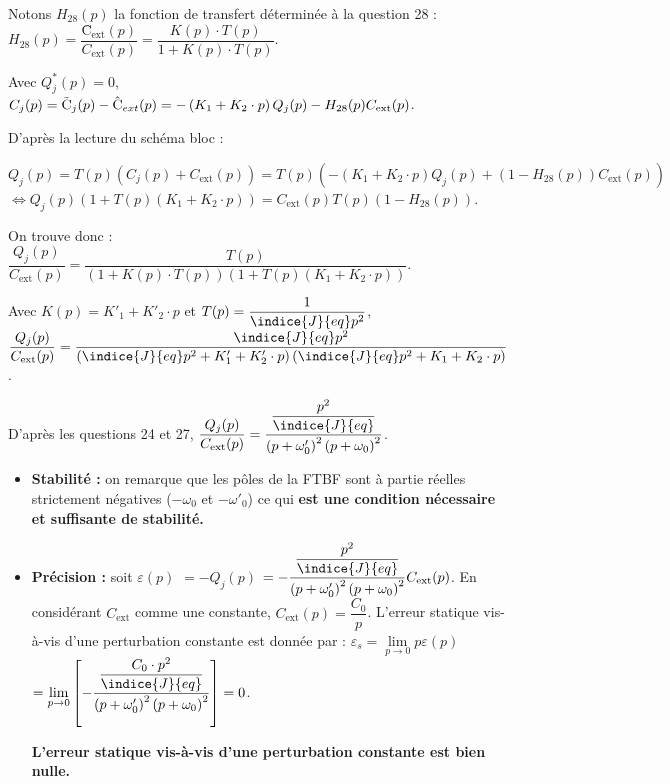 \ifprof
\begin{corrige}

Notons $H_{28}(p)$ la fonction de transfert déterminée à la question 28 :  $
H_{28}(p)=\dfrac{\text{\^{C}}_{\text{ext}}(p)}{C_{\text{ext}}(p)}=\dfrac{K(p)\cdot T(p)}{1+K(p)\cdot T(p)}$.

Avec $Q^*_j(p)=0$, $
C_j(p)=\text{\~{C}}_j(p)-\text{\^{C}}_{ext}(p)=-\left(K_1+K_2\cdot p\right)Q_j(p)-H_{28}(p)C_{\text{ext}}(p)\\
$.

D'après la lecture du schéma bloc : 

$Q_j(p)=T(p)\left(C_j(p)+C_{\text{ext}}(p)\right)=T(p)\left(-\left(K_1+K_2\cdot p\right)Q_j(p)+\left(1-H_{28}(p)\right)C_{\text{ext}}(p)\right) $
$ \Leftrightarrow 
Q_j(p)\left(1+T(p)\left(K_1+K_2\cdot p\right)\right)=C_{\text{ext}}(p)T(p)\left(1-H_{28}(p)\right)$.

On trouve donc : $
\dfrac{Q_j(p)}{C_{\text{ext}}(p)}=\dfrac{T(p)}{\left(1+K(p)\cdot T(p)\right)\left(1+T(p)\left(K_1+K_2\cdot p\right)\right)}
$.

Avec $K(p)=K'_1+K'_2\cdot p$ et $T(p)=\dfrac{1}{\indice{J}{eq}p^2}$,
$
\dfrac{Q_j(p)}{C_{\text{ext}}(p)}=\dfrac{\indice{J}{eq}p^2}{\left(\indice{J}{eq}p^2+K'_1+K'_2\cdot p\right)\left(\indice{J}{eq}p^2+K_1+K_2\cdot p\right)}
$.

D'après les questions 24 et 27,
$
\dfrac{Q_j(p)}{C_{\text{ext}}(p)}=\dfrac{\dfrac{p^2}{\indice{J}{eq}}}{\left(p+\omega'_0\right)^2\left(p+\omega_0\right)^2}
$.



\begin{itemize}
\item \textbf{Stabilité : } on remarque que les pôles de la FTBF sont à partie réelles strictement négatives ($-\omega_0$ et $-\omega'_0$) ce qui \textbf{est une condition nécessaire et suffisante de stabilité.}
\item \textbf{Précision : } soit $\varepsilon(p)$ $=-Q_j(p)$ $=-\dfrac{\dfrac{p^2}{\indice{J}{eq}}}{\left(p+\omega'_0\right)^2\left(p+\omega_0\right)^2}C_{\text{ext}}(p)$. En considérant $C_{\text{ext}}$ comme une constante, $C_{\text{ext}}(p)=\dfrac{C_0}{p}$. 
L'erreur statique vis-à-vis d'une perturbation constante est donnée par :
$\varepsilon_s= \lim\limits_{p\rightarrow0} p\varepsilon(p)$ $= \lim\limits_{p\rightarrow0}\left[-\dfrac{\dfrac{C_0\cdot p^2}{\indice{J}{eq}}}{\left(p+\omega'_0\right)^2\left(p+\omega_0\right)^2}\right]=0
$.

\textbf{L'erreur statique vis-à-vis d'une perturbation constante est bien nulle.}
\end{itemize}

\end{corrige}
\else
\fi
